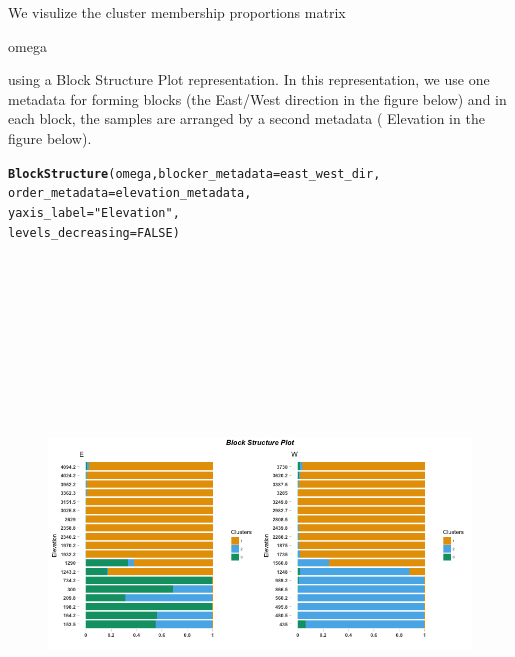 \documentclass[12pt]{article}\usepackage[]{graphicx}\usepackage[usenames,dvipsnames]{color}
\makeatletter
\newcommand{\hlnum}[1]{\textcolor[rgb]{0.686,0.059,0.569}{#1}}%
\newcommand{\hlstr}[1]{\textcolor[rgb]{0.192,0.494,0.8}{#1}}%
\newcommand{\hlstd}[1]{\textcolor[rgb]{0.345,0.345,0.345}{#1}}%
\newcommand{\hlkwc}[1]{\textcolor[rgb]{0.333,0.667,0.333}{#1}}%
\newcommand{\hlkwd}[1]{\textcolor[rgb]{0.737,0.353,0.396}{\textbf{#1}}}%
\newenvironment{kframe}{%
 \def\at@end@of@kframe{}%
 \ifinner\ifhmode%
  \def\at@end@of@kframe{\end{minipage}}%
  \begin{minipage}{\columnwidth}%
 \fi\fi%
 \def\FrameCommand##1{\hskip\@totalleftmargin \hskip-\fboxsep
 \colorbox{shadecolor}{##1}\hskip-\fboxsep
     \hskip-\linewidth \hskip-\@totalleftmargin \hskip\columnwidth}%
 \MakeFramed {\advance\hsize-\width
   \@totalleftmargin\z@ \linewidth\hsize
   \@setminipage}}%
 {\par\unskip\endMakeFramed%
 \at@end@of@kframe}
\newenvironment{knitrout}{}{} %
\makeatother
\begin{document}
We visulize the cluster membership proportions matrix \begin{verb} omega \end{verb} using a Block Structure Plot representation. In this representation, we use one metadata for forming blocks (the East/West direction in the figure below) and in each block, the samples are arranged by a second metadata ( Elevation in the figure below).

\begin{knitrout}
\color{fgcolor}\begin{kframe}
\begin{alltt}
\hlkwd{BlockStructure}\hlstd{(omega,} \hlkwc{blocker_metadata} \hlstd{= east_west_dir,}
               \hlkwc{order_metadata} \hlstd{= elevation_metadata,}
               \hlkwc{yaxis_label} \hlstd{=} \hlstr{"Elevation"}\hlstd{,}
               \hlkwc{levels_decreasing} \hlstd{=} \hlnum{FALSE}\hlstd{)}
\end{alltt}
\end{kframe}
\end{knitrout}


\begin{figure}[htp]
\begin{center}
\includegraphics[width=6in,height=6in]{figure/block_structure.png}
\end{center}
\end{figure}
\end{document}
